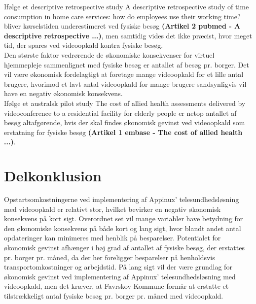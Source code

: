 Ifølge et descriptive retrospective study A descriptive retrospective study of time consumption in home care services: how do employees use their working time? bliver kørselstiden underestimeret ved fysiske besøg \textbf{(Artikel 2 pubmed - A descriptive retrospective ...)},  men samtidig vides det ikke præcist, hvor meget tid, der spares ved videoopkald kontra fysiske besøg. \\
Den største faktor vedrørende de økonomiske konsekvenser for virtuel hjemmepleje sammenlignet med fysiske besøg er antallet af besøg pr. borger. Det vil være økonomisk fordelagtigt at foretage mange videoopkald for et lille antal brugere, hvorimod et lavt antal videoopkald for mange brugere sandsynligvis vil have en negativ økonomisk konsekvens. \\
Ifølge et australsk pilot study The cost of allied health assessments delivered by videoconference to a residential facility for elderly people er netop antallet af besøg altafgørende, hvis der skal findes økonomisk gevinst ved videoopkald som erstatning for fysiske besøg \textbf{(Artikel 1 embase - The cost of allied health ...)}.

\section{Delkonklusion}
Opstartsomkostningerne ved implementering af Appinux’ telesundhedsløsning med videoopkald er relativt stor, hvilket bevirker en negativ økonomisk konsekvens på kort sigt. 
Overordnet set vil mange variabler have betydning for den økonomiske konsekvens på både kort og lang sigt, hvor blandt andet antal opdateringer kan minimeres med henblik på besparelser. 
Potentialet for økonomisk gevinst afhænger i høj grad af antallet af fysiske besøg, der erstattes pr. borger pr. måned, da der her foreligger besparelser på henholdsvis transportomkostninger og arbejdstid.
På lang sigt vil der være grundlag for økonomisk gevinst ved implementering af Appinux’ telesundhedsløsning med videoopkald, men det kræver, at
Favrskov Kommune formår at erstatte et tilstrækkeligt antal fysiske besøg pr. borger pr. måned med videoopkald.

